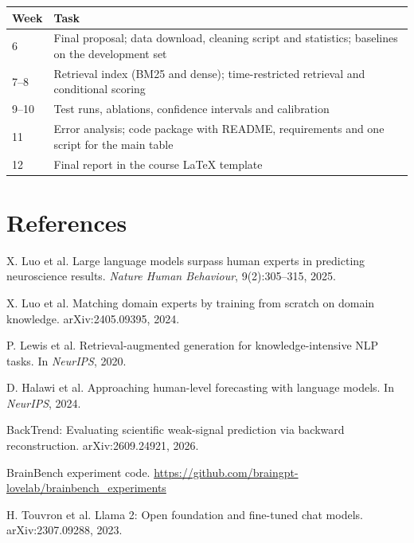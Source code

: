 \documentclass[10pt,a4paper]{article}
\begin{document}
\begin{center}\small
\begin{tabular}{lp{13.2cm}}
\toprule
Week & Task\\
\midrule
6      & Final proposal; data download, cleaning script and statistics; baselines on the development set\\
7--8   & Retrieval index (BM25 and dense); time-restricted retrieval and conditional scoring\\
9--10  & Test runs, ablations, confidence intervals and calibration\\
11     & Error analysis; code package with README, requirements and one script for the main table\\
12     & Final report in the course \LaTeX{} template\\
\bottomrule
\end{tabular}
\end{center}

\section*{References}
\small
\begin{enumerate}[label={[\arabic*]},leftmargin=2em]
\item X. Luo et al. Large language models surpass human experts in predicting neuroscience results. \emph{Nature Human Behaviour}, 9(2):305--315, 2025.
\item X. Luo et al. Matching domain experts by training from scratch on domain knowledge. arXiv:2405.09395, 2024.
\item P. Lewis et al. Retrieval-augmented generation for knowledge-intensive NLP tasks. In \emph{NeurIPS}, 2020.
\item D. Halawi et al. Approaching human-level forecasting with language models. In \emph{NeurIPS}, 2024.
\item BackTrend: Evaluating scientific weak-signal prediction via backward reconstruction. arXiv:2609.24921, 2026.
\item BrainBench experiment code. \url{https://github.com/braingpt-lovelab/brainbench_experiments}
\item H. Touvron et al. Llama 2: Open foundation and fine-tuned chat models. arXiv:2307.09288, 2023.
\end{enumerate}
\end{document}
